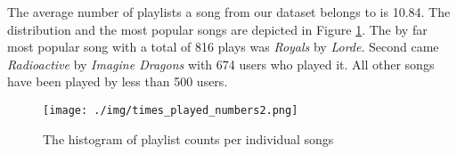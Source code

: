 The average number of playlists a song from our dataset belongs to is 10.84. The
distribution and the most popular songs are depicted in Figure
\ref{fig:popular_song_distribution}. The by far most popular song with a total of 816
plays was \textit{Royals} by \textit{Lorde}. Second came \textit{Radioactive} by
\textit{Imagine Dragons} with 674 users who played it. All other songs have been
played by less than 500 users.

\begin{figure}[]
    \centering
	\texttt{[image: ./img/times\_played\_numbers2.png]}
	\caption{The histogram of playlist counts per individual songs}
	\label{fig:popular_song_distribution}
\end{figure}
